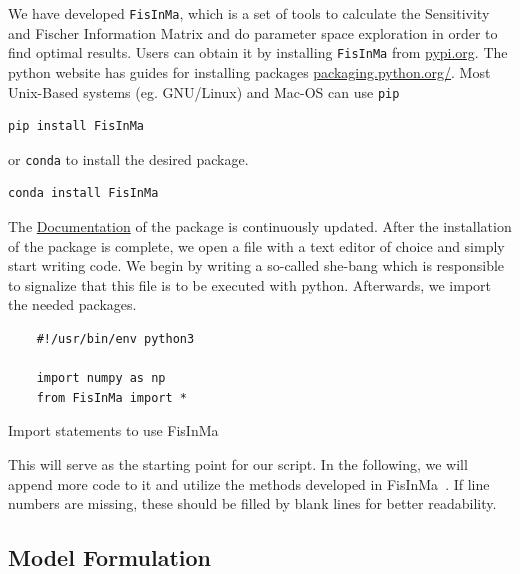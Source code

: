 \documentclass[10pt,A4paper]{article}
\begin{document}
We have developed \texttt{FisInMa}, which is a set of tools to calculate the Sensitivity and Fischer Information Matrix and do parameter space exploration in order to find optimal results.
Users can obtain it by installing \texttt{FisInMa} from \href{https://pypi.org/project/FisInMa/0.0.1/}{pypi.org}.
The python website has guides for installing packages \href{https://packaging.python.org/en/latest/tutorials/installing-packages/}{packaging.python.org/}.
Most Unix-Based systems (eg. GNU/Linux) and Mac-OS can use \texttt{pip}
\begin{verbatim}
pip install FisInMa
\end{verbatim}
or \texttt{conda} to install the desired package.
\begin{verbatim}
conda install FisInMa
\end{verbatim}
The \href{https://spatial-systems-biology-freiburg.github.io/FisInMa/}{Documentation} of the package is continuously updated.
After the installation of the package is complete, we open a file with a text editor of choice and simply start writing code.
We begin by writing a so-called she-bang which is responsible to signalize that this file is to be executed with python.
Afterwards, we import the needed packages.
\begin{code}[h]
    \begin{verbatim}
    #!/usr/bin/env python3

    import numpy as np
    from FisInMa import *
    \end{verbatim}
    \caption{Import statements to use FisInMa}
    \label{code:import_statements}
\end{code}
This will serve as the starting point for our script.
In the following, we will append more code to it and utilize the methods developed in FisInMa~\cite{}.%
If line numbers are missing, these should be filled by blank lines for better readability.
%
%
\subsection*{Model Formulation}
\end{document}
